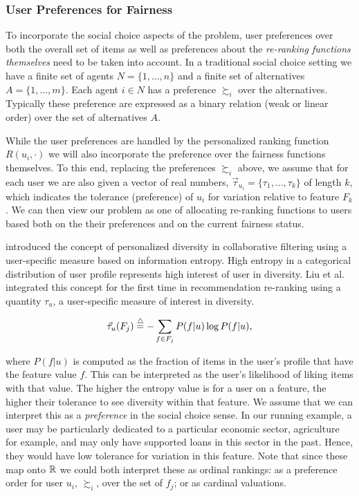 \subsubsection{\textbf{User Preferences for Fairness}}
\hfill

To incorporate the social choice aspects of the problem, user preferences over both the overall set of items as well as preferences about the \emph{re-ranking functions themselves} need to be taken into account. In a traditional social choice setting we have a finite set of agents $N = \{1, \ldots, n\}$ and a finite set of alternatives $A = \{1, \ldots, m\}$. Each agent $i \in N$ has a preference $\succsim_i$ over the alternatives. Typically these preference are expressed as a binary relation (weak or linear order) over the set of alternatives $A$.  

While the user preferences are handled by the personalized ranking function $R(u_i, \cdot)$ we will also incorporate the preference over the fairness functions themselves. To this end, replacing the preferences $\succsim_i$ above, we assume that for each user we are also given a vector of real numbers, $\vec{\tau}_{u_i} = \{\tau_1, \ldots, \tau_k\}$ of length $k$, which indicates the tolerance (preference) of $u_i$ for variation relative to feature $F_k$.  We can then view our problem as one of allocating re-ranking functions to users based both on the their preferences and on the current fairness status.
 
\cite{eskan2017-personalized-diversity} introduced the concept of personalized diversity in collaborative filtering using a user-specific measure based on information entropy. High entropy in a categorical distribution of user profile represents high interest of user in diversity. Liu et al. \cite{liu2018personalizing,liu2019personalized} integrated this concept for the first time in recommendation re-ranking using a quantity $\tau_u$, a user-specific measure of interest in diversity.

\begin{equation}
\vec{\tau}_u(F_{j})\buildrel\triangle\over=-\sum_{f \in F_j} P(f|u)\log P(f|u),
\label{eq:tau}
\end{equation}

\noindent where $P(f|u)$ is computed as the fraction of items in the user's profile that have the feature value $f$. This can be interpreted as the user's likelihood of liking items with that value. The higher the entropy value is for a user on a feature, the higher their tolerance to see diversity within that feature. We assume that we can interpret this as a \emph{preference} in the social choice sense. In our running example, a user may be particularly dedicated to a particular economic sector, agriculture for example, and may only have supported loans in this sector in the past.  Hence, they would have low tolerance for variation in this feature. Note that since these map onto $\mathbb{R}$ we could both interpret these as ordinal rankings: as a preference order for user $u_i$, $\succsim_i$, over the set of $f_j$; or as cardinal valuations.

